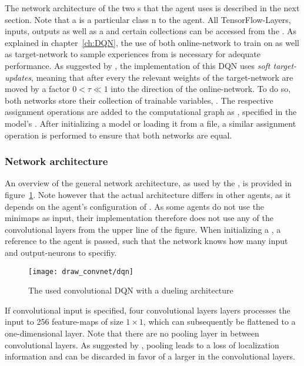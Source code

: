 The network architecture of the two s that the agent uses is described in the next section. Note that a  is a particular class n to the agent. All TensorFlow-Layers, inputs, outputs as well as a  and certain collections can be accessed from the . As explained in chapter~\ref{ch:DQN}, the use of both online-network to train on as well as target-network to sample experiences from is necessary for adequate performance. As suggested by \cite{lillicrap_continuous_2015}, the implementation of this DQN uses \textit{soft target-updates}, meaning that after every  the relevant weights of the target-network are moved by a factor $0 < \tau \ll 1$ into the direction of the online-network. To do so, both networks store their collection of trainable variables,  . The respective assignment operations are added to the computational graph as , specified in the model's . After initializing a model or loading it from a file, a similar assignment operation is performed to ensure that both networks are equal.

\subsubsection{Network architecture}

An overview of the general network architecture, as used by the , is provided in figure~\ref{fig:dqn_graph}. Note however that the actual architecture differs in other agents, as it depends on the agent's configuration of . As some agents do not use the minimaps as input, their implementation therefore does not use any of the convolutional layers from the upper line of the figure. When initializing a , a reference to the agent is passed, such that the network knows how many input and output-neurons to specifiy.

\begin{figure}[h]
	\centering 
	\texttt{[image: draw\_convnet/dqn]}
	\caption{The used convolutional DQN with a dueling architecture}
	\label{fig:dqn_graph}
\end{figure}

If convolutional input is specified, four convolutional layers layers processes the input to 256 feature-maps of size $1 \times 1$, which can subsequently be flattened to a one-dimensional layer. Note that there are no pooling layer in between convolutional layers. As suggested by \cite{springenberg_striving_2014}, pooling leads to a loss of localization information and can be discarded in favor of a larger  in the convolutional layers.

